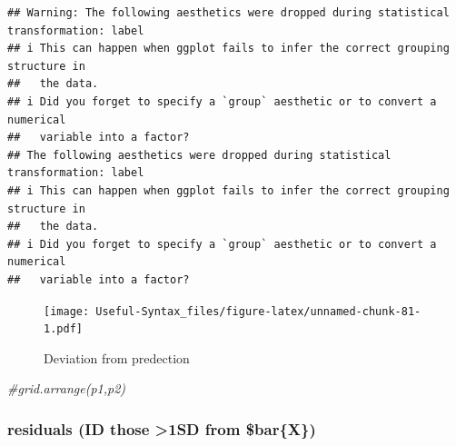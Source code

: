 \documentclass[
]{article}
\newenvironment{Shaded}{\begin{snugshade}}{\end{snugshade}}
\newcommand{\CommentTok}[1]{\textcolor[rgb]{0.56,0.35,0.01}{\textit{#1}}}
\begin{document}
\begin{verbatim}
## Warning: The following aesthetics were dropped during statistical transformation: label
## i This can happen when ggplot fails to infer the correct grouping structure in
##   the data.
## i Did you forget to specify a `group` aesthetic or to convert a numerical
##   variable into a factor?
## The following aesthetics were dropped during statistical transformation: label
## i This can happen when ggplot fails to infer the correct grouping structure in
##   the data.
## i Did you forget to specify a `group` aesthetic or to convert a numerical
##   variable into a factor?
\end{verbatim}

\begin{figure}
\centering
\texttt{[image: Useful-Syntax\_files/figure-latex/unnamed-chunk-81-1.pdf]}
\caption{\label{fig:unnamed-chunk-81}Deviation from predection}
\end{figure}

\begin{Shaded}
\begin{Highlighting}[]
\CommentTok{\#grid.arrange(p1,p2)}
\end{Highlighting}
\end{Shaded}

\hypertarget{residuals-id-those-1sd-from-barx}{%
\subsubsection{residuals (ID those \textgreater1SD from \$bar\{X\})}\label{residuals-id-those-1sd-from-barx}}
\end{document}
